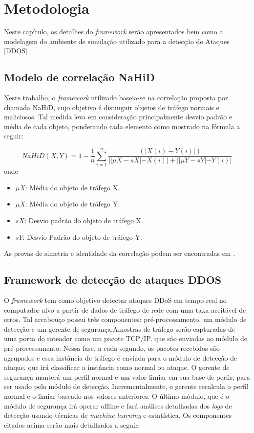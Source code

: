 \chapter[Metodologia]{Metodologia}
\label{Simulacao}

Neste capítulo, os detalhes do \textit{framework} serão apresentados bem como a modelagem do ambiente de simulação utilizado para a detecção de Ataques [DDOS]

\section{Modelo de correlação NaHiD}

Neste trabalho, o \textit{framework} utilizado baseia-se na correlação proposta por \cite{HOQUE201748} chamada NaHiD, cujo objetivo é distinguir objetos de tráfego normais e maliciosos. Tal medida leva em consideração principalmente desvio padrão e média de cada objeto, ponderando cada elemento como mostrado na fórmula a seguir:  

\begin{equation}
	NaHiD(X,Y) = 1 - \frac{1}{n} \sum_{i=1}^{n} \frac{\left(|X(i) - Y(i)|\right)}{||\mu{X} - sX| - X(i)| + ||\mu{Y} - sY| - Y(i)|}
\end{equation}
onde
\begin{itemize}
	\item $\mu{X}$: Média do objeto de tráfego X.
 	\item $\mu{X}$: Média do objeto de tráfego Y.
	\item $sX$: Desvio padrão do objeto de tráfego X.
	\item $sY$: Desvio Padrão do objeto de tráfego Y.
\end{itemize}
As provas de simetria e identidade da correlação podem ser encontradas em \cite{HOQUE201748}.

\section{Framework de detecção de ataques DDOS}
O \textit{framework} tem como objetivo detectar ataques DDoS em tempo real no computador alvo a partir de dados de tráfego de rede com uma taxa aceitável de erros. Tal arcabouço possui três componentes: pré-processamento, um módulo de detecção e um gerente de segurança.Amostras de tráfego serão capturadas de uma porta do roteador como um pacote TCP/IP, que são enviadas ao módulo de pré-processamento. Nessa fase, a cada segundo, os pacotes recebidos são agrupados e essa instância de tráfego é enviada para o módulo de detecção de ataque, que irá classificar a instância como normal ou ataque. O gerente de segurança manterá um perfil normal e um valor limiar em sua base de perfis, para ser usado pelo módulo de detecção. Incrementalmente, o gerente recalcula o perfil normal e o limiar baseado nos valores anteriores. O último módulo, que é o módulo de segurança irá operar offline e fará análises detalhadas dos \textit{logs} de detecção usando técnicas de \textit{machine learning} e estatística. Os componentes citados acima serão mais detalhados a seguir.
